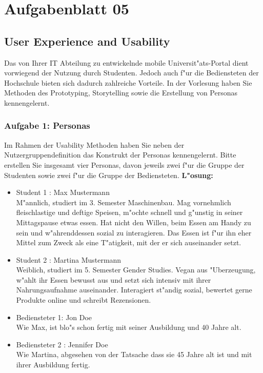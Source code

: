 

\chapter{Aufgabenblatt 05}

\section{ User Experience and Usability }
Das  von  Ihrer  IT  Abteilung  zu  entwickelnde  mobile  Universit"ats-Portal  dient  vorwiegend  der Nutzung  durch  Studenten.  
Jedoch  auch  f"ur  die  Bediensteten  der  Hochschule  bieten  sich dadurch  zahlreiche  Vorteile.  
In  der  Vorlesung  haben  Sie  Methoden  des  Prototyping, Storytelling sowie die Erstellung von Personas kennengelernt. 


\subsection{Aufgabe 1: Personas}
Im  Rahmen  der  Usability  Methoden  haben  Sie  neben  der  Nutzergruppendefinition  das Konstrukt der Personas kennengelernt.  
Bitte erstellen Sie insgesamt vier Personas, davon jeweils zwei f"ur die Gruppe der Studenten sowie zwei f"ur die Gruppe der Bediensteten. 
\noindent
\textbf{L"osung:}
\begin{itemize}
    \item Student 1 : Max Mustermann\\
        M"annlich, studiert im 3. Semester Maschinenbau.
        Mag vornehmlich fleischlastige und deftige Speisen, m"ochte schnell und g"unstig in seiner Mittagspause etwas essen.
        Hat nicht den Willen, beim Essen am Handy zu sein und w"ahrenddessen sozial zu interagieren.
        Das Essen ist f"ur ihn eher Mittel zum Zweck als eine T"atigkeit, mit der er sich auseinander setzt.
    \item Student 2 : Martina Mustermann\\
        Weiblich, studiert im 5. Semester Gender Studies.
        Vegan aus "Uberzeugung, w"ahlt ihr Essen bewusst aus und setzt sich intensiv mit ihrer Nahrungsaufnahme auseinander.
        Interagiert st"andig sozial, bewertet gerne Produkte online und schreibt Rezensionen.
    \item Bediensteter 1: Jon Doe\\
        Wie Max, ist blo"s schon fertig mit seiner Ausbildung und 40 Jahre alt. 
    \item Bediensteter 2 : Jennifer Doe\\
        Wie Martina, abgesehen von der Tatsache dass sie 45 Jahre alt ist und mit ihrer Ausbildung fertig.
\end{itemize}

